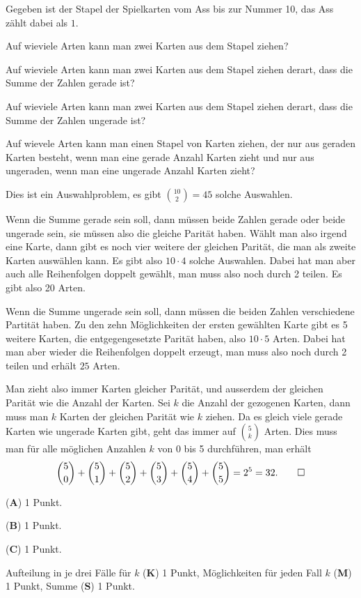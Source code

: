 Gegeben ist der Stapel der Spielkarten vom Ass bis zur Nummer 10,
das Ass zählt dabei als $1$.
\begin{center}
\end{center}

\begin{teilaufgaben}
\item 
Auf wieviele Arten kann man zwei Karten aus dem Stapel ziehen?
\item
Auf wieviele Arten kann man zwei Karten aus dem Stapel ziehen derart,
dass die Summe der Zahlen gerade ist?
\item
Auf wieviele Arten kann man zwei Karten aus dem Stapel ziehen derart,
dass die Summe der Zahlen ungerade ist?
\item
Auf wievele Arten kann man einen Stapel von Karten ziehen, der
nur aus geraden Karten besteht, wenn man eine gerade Anzahl Karten
zieht und nur aus ungeraden, wenn man eine ungerade Anzahl Karten zieht?
\end{teilaufgaben}


\begin{loesung}
\begin{teilaufgaben}
\item
Dies ist ein Auswahlproblem, es gibt $\binom{10}{2}=45$ solche Auswahlen.
\item
Wenn die Summe gerade sein soll, dann müssen beide Zahlen gerade oder beide
ungerade sein, sie müssen also die gleiche Parität haben.
Wählt man also irgend eine Karte, dann gibt es noch vier weitere der gleichen
Parität, die man als zweite Karten auswählen kann.
Es gibt also $10\cdot 4$ solche Auswahlen.
Dabei hat man aber auch alle Reihenfolgen doppelt gewählt, man muss also
noch durch 2 teilen.
Es gibt also 20 Arten.
\item
Wenn die Summe ungerade sein soll, dann müssen die beiden Zahlen verschiedene
Partität haben.
Zu den zehn Möglichkeiten der ersten gewählten Karte gibt es 5 weitere
Karten, die entgegengesetzte Parität haben, also $10\cdot 5$ Arten.
Dabei hat man aber wieder die Reihenfolgen doppelt erzeugt, man muss
also noch durch 2 teilen und erhält $25$ Arten.
\item
Man zieht also immer Karten gleicher Parität, und ausserdem der gleichen
Parität wie die Anzahl der Karten.
Sei $k$ die Anzahl der gezogenen Karten, dann muss man $k$ Karten der gleichen
Parität wie $k$ ziehen.
Da es gleich viele gerade Karten  wie ungerade Karten gibt, geht das immer
auf $\binom{5}{k}$ Arten.
Dies muss man für alle möglichen Anzahlen $k$ von 0 bis 5 durchführen, man
erhält
\[
\binom{5}{0}
+
\binom{5}{1}
+
\binom{5}{2}
+
\binom{5}{3}
+
\binom{5}{4}
+
\binom{5}{5}
=
2^5
=
32.
\qedhere
\]
\end{teilaufgaben}
\end{loesung}

\begin{bewertung}
\begin{teilaufgaben}
\item ({\bf A}) 1 Punkt.
\item ({\bf B}) 1 Punkt.
\item ({\bf C}) 1 Punkt.
\item Aufteilung in je drei Fälle für $k$ ({\bf K}) 1 Punkt,
Möglichkeiten für jeden Fall $k$ ({\bf M}) 1 Punkt,
Summe ({\bf S}) 1 Punkt.
\end{teilaufgaben}
\end{bewertung}
